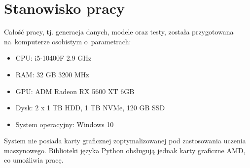 \section{Stanowisko pracy}
Całość pracy, tj. generacja danych, modele oraz testy, została przygotowana na~komputerze osobistym o~parametrach:

\begin{itemize}[label=-,labelsep=0.4cm,leftmargin=0.6cm]
\item CPU: i5-10400F 2.9 GHz
\item RAM: 32 GB 3200 MHz
\item GPU: ADM Radeon RX 5600 XT 6GB
\item Dysk: 2 x 1 TB HDD, 1 TB NVMe, 120 GB SSD
\item System operacyjny: Windows 10
\end{itemize}
System nie posiada karty graficznej zoptymalizowanej pod zastosowania uczenia maszynowego.
Biblioteki języka Python obsługują jednak karty graficzne AMD, co umożliwia pracę.
